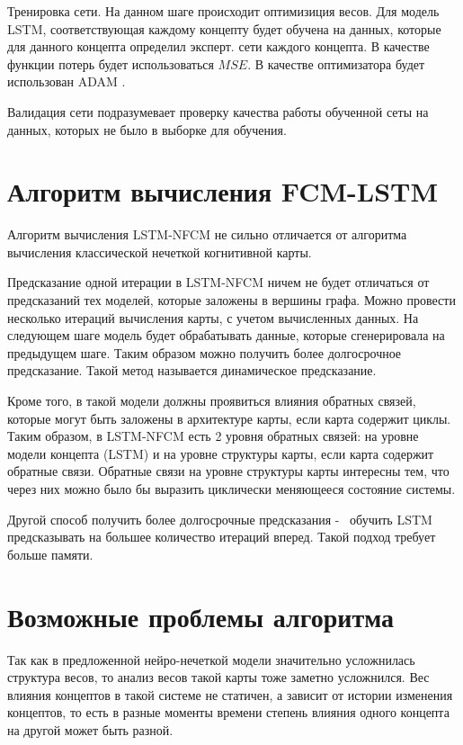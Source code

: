 Тренировка сети. На данном шаге происходит оптимизиция весов.
Для модель LSTM, соответствующая каждому концепту будет обучена
на данных, которые для данного концепта определил эксперт.
сети каждого концепта. В качестве функции потерь будет использоваться $ MSE $.
В качестве оптимизатора будет использован ADAM \cite{adam2014}.

Валидация сети подразумевает
проверку качества работы обученной сеты на данных,
которых не было в выборке для обучения.

\section{Алгоритм вычисления FCM-LSTM}

Алгоритм вычисления LSTM-NFCM не сильно отличается от
алгоритма вычисления классической нечеткой когнитивной карты.

Предсказание одной итерации в LSTM-NFCM ничем не будет отличаться
от предсказаний тех моделей, которые заложены в вершины графа.
Можно провести несколько итераций вычисления карты, с учетом вычисленных
данных. На следующем шаге модель будет обрабатывать данные,
которые сгенерировала на предыдущем шаге. Таким образом можно получить
более долгосрочное предсказание. Такой метод называется динамическое предсказание.

Кроме того, в такой модели должны проявиться влияния обратных связей, которые могут
быть заложены в архитектуре карты, если карта содержит циклы.
Таким образом, в LSTM-NFCM есть 2 уровня обратных связей:
на уровне модели концепта (LSTM) и на уровне структуры карты,
если карта содержит обратные связи.
Обратные связи на уровне структуры карты интересны тем, что
через них можно было бы выразить циклически меняющееся состояние системы.

Другой способ получить более долгосрочные предсказания -~ обучить LSTM
предсказывать на большее количество итераций вперед. Такой подход
требует больше памяти.

\section{Возможные проблемы алгоритма}

Так как в предложенной нейро-нечеткой модели
значительно усложнилась структура весов, то
анализ весов такой карты тоже заметно усложнился.
Вес влияния концептов в такой системе не статичен,
а зависит от истории изменения концептов, то есть
в разные моменты времени степень влияния одного концепта
на другой может быть разной.

